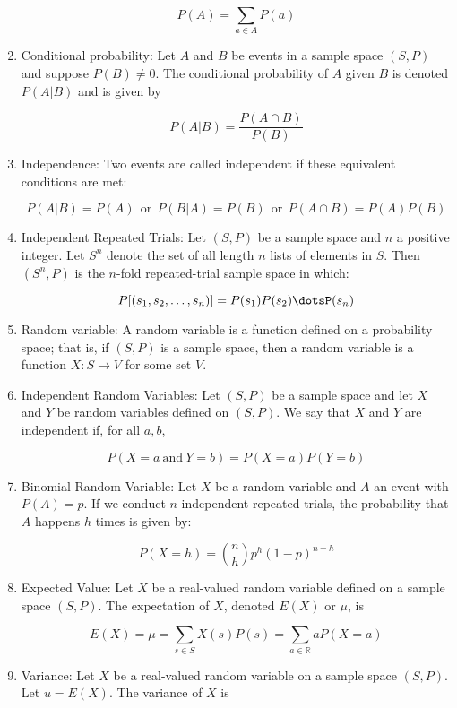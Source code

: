 \documentclass{article}
\begin{document}
\begin{enumerate}
    \[P(A)=\sum_{a\in A}P(a)\]
    
    \item Conditional probability: Let $A$ and $B$ be events in a sample space $(S,P)$ and suppose $P(B)\neq 0$. The conditional probability of $A$ given $B$ is denoted $P(A|B)$ and is given by 
    
    \[P(A|B)=\frac{P(A\cap B)}{P(B)}\]
    
    \item Independence: Two events are called independent if these equivalent conditions are met: 
    
    \[P(A|B)=P(A)\:\: \text{or} \:\: P(B|A)=P(B) \:\: \text{or} \:\: P(A\cap B)=P(A)P(B)\]
    
    \item Independent Repeated Trials: Let $(S,P)$ be a sample space and $n$ a positive integer. Let $S^n$ denote the set of all length $n$ lists of elements in $S$. Then $(S^n,P)$ is the $n$-fold repeated-trial sample space in which: 
    
    \[P[(s_1,s_2,\dots,s_n)]=P(s_1)P(s_2)\dotsP(s_n)\]
    
    \item Random variable: A random variable is a function defined on a probability space; that is, if $(S,P)$ is a sample space, then a random variable is a function $X:S\to V$ for some set $V$.
    
    \item Independent Random Variables: Let $(S,P)$ be a sample space and let $X$ and $Y$ be random variables defined on $(S,P)$. We say that $X$ and $Y$ are independent if, for all $a,b$, 
    
    \[P(X=a\: \text{and} \: Y=b)=P(X=a)P(Y=b)\]
    
    \item Binomial Random Variable: Let $X$ be a random variable and $A$ an event with $P(A)=p$. If we conduct $n$ independent repeated trials, the probability that $A$ happens $h$ times is given by:
    
     \[P(X=h)= {n \choose h} p^h(1-p)^{n-h}\]
    
    \item Expected Value: Let $X$ be a real-valued random variable defined on a sample space $(S,P)$. The expectation of $X$, denoted $E(X)$ or $\mu$, is 
    
    \[E(X)=\mu=\sum_{s\in S}X(s)P(s)=\sum_{a\in\mathbb{R}}aP(X=a)\]
    
    \item Variance: Let $X$ be a real-valued random variable on a sample space $(S,P)$. Let $u=E(X)$. The variance of $X$ is
    

\end{enumerate}
\end{document}
